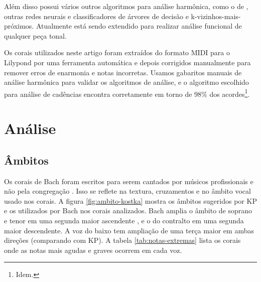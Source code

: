 Além disso \rameau{} possui vários outros algoritmos para análise
harmônica, como o de \cite{pardo.ea00:automated}, outras redes neurais
e classificadores de árvores de decisão e k-vizinhos-mais-próximos.
Atualmente \rameau{} está sendo extendido para realizar análise
funcional de qualquer peça tonal.

Os corais utilizados neste artigo foram extraídos do formato MIDI para
o Lilypond por uma ferramenta automática e depois corrigidos
manualmente para remover erros de enarmonia e notas incorretas. Usamos
gabaritos manuais de análise harmônica para validar os algoritmos de
análise, e o algoritmo escolhido para análise de cadências encontra
corretamente em torno de 98\% dos acordes\footnote{Idem.}.

\section{Análise}
\label{sec:analise}

\subsection{Âmbitos}
\label{sec:ambitos}

Os corais de Bach foram escritos para serem cantados por músicos
profissionais e não pela congregação \cite{bach41:371} . Isso  se reflete na textura, cruzamentos e no âmbito vocal usado nos
corais. A figura \ref{fig:ambito-kostka} mostra os âmbitos sugeridos
por KP e os utilizados por Bach nos corais analizados. Bach amplia o
âmbito de soprano e tenor em uma segunda maior ascendente , e o
do contralto em uma segunda maior descendente. A voz do baixo tem
ampliação de uma terça maior em ambas direções (comparando com KP). A
tabela \ref{tab:notas-extremas} lista os corais onde as notas mais
agudas e graves ocorrem em cada voz.

